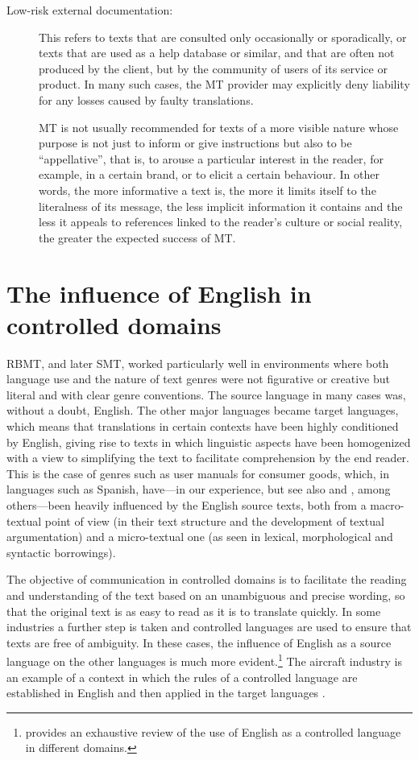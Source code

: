 \documentclass[output=paper,colorlinks,citecolor=brown,
]{langscibook}
\begin{document}
\begin{description}
\item[Low-risk external documentation:]

This refers to texts that are consulted only occasionally or sporadically, or texts that are used as a help database or similar, and that are often not produced by the client, but by the community of users of its service or product. In many such cases, the MT provider may explicitly deny liability for any losses caused by faulty translations.

MT is not usually recommended for texts of a more visible nature whose purpose is not just to inform or give instructions but also to be “appellative”, that is, to arouse a particular interest in the reader, for example, in a certain brand, or to elicit a certain behaviour. In other words, the more informative a text is, the more it limits itself to the literalness of its message, the less implicit information it contains and the less it appeals to references linked to the reader’s culture or social reality, the greater the expected success of MT.
\end{description}

\section{The influence of English in controlled domains}

RBMT, and later SMT, worked particularly well in environments where both language use and the nature of text genres were not figurative or creative but literal and with clear genre conventions. The source language in many cases was, without a doubt, English. The other major languages became target languages, which means that translations in certain contexts have been highly conditioned by English, giving rise to texts in which linguistic aspects have been homogenized with a view to simplifying the text to facilitate comprehension by the end reader. This is the case of genres such as user manuals for consumer goods, which, in languages such as Spanish, have—in our experience, but see also \citet{Navarro2008} and \citet{Aixelá2011}, among others—been heavily influenced by the English source texts, both from a macro-textual point of view (in their text structure and the development of textual argumentation) and a micro-textual one (as seen in lexical, morphological and syntactic borrowings). 

The objective of communication in controlled domains is to facilitate the reading and understanding of the text based on an unambiguous and precise wording, so that the original text is as easy to read as it is to translate quickly. In some industries a further step is taken and controlled languages are used to ensure that texts are free of ambiguity. In these cases, the influence of English as a source language on the other languages is much more evident.\footnote{\citet{SeoaneVicente2015} provides an exhaustive review of the use of English as a controlled language in different domains.} The aircraft industry is an example of a context in which the rules of a controlled language are established in English and then applied in the target languages \citep{Ghiara2018}.
\end{document}
